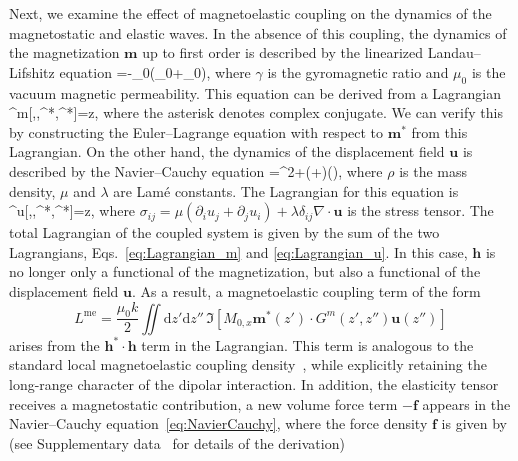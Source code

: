\documentclass[aps,prb,10pt,amsmath,amssymb,twocolumn,longbibliography,superscriptaddress]{revtex4-2}
\def\be#1\ee{\begin{align}#1\end{align}}
\newcommand{\rmd}{\mathrm{d}}
\begin{document}
Next, we examine the effect of magnetoelastic coupling on the dynamics of the magnetostatic and elastic waves. In the absence of this coupling, the dynamics of the magnetization $\bm{m}$ up to first order is described by the linearized Landau--Lifshitz equation
\be
    \dot{\bm{m}}=-\gamma\mu_0\left(\times{}_0+_0\times{}\right),\label{eq:LandauLifshitz}
\ee
where $\gamma$ is the gyromagnetic ratio and $\mu_0$ is the vacuum magnetic permeability. This equation can be derived from a Lagrangian
\be
    L^m[,,^*,^*]=\int\rmd z\Re{},\label{eq:Lagrangian_m}
\ee
where the asterisk denotes complex conjugate. We can verify this by constructing the Euler--Lagrange equation with respect to $\bm{m}^*$ from this Lagrangian. On the other hand, the dynamics of the displacement field $\bm{u}$ is described by the Navier--Cauchy equation
\be
    \rho{}=\mu\nabla^2+\left(\mu+\lambda\right)\nabla\left(\nabla\cdot{}\right),\label{eq:NavierCauchy}
\ee
where $\rho$ is the mass density, $\mu$ and $\lambda$ are Lam\'e constants. The Lagrangian for this equation is
\be
    L^u[,,^*,^*]=\int\rmd z\Re{},\label{eq:Lagrangian_u}
\ee
where $\sigma_{ij}=\mu(\partial_i u_j+\partial_j u_i)+\lambda\delta_{ij}\nabla\cdot\bm{u}$ is the stress tensor. The total Lagrangian of the coupled system is given by the sum of the two Lagrangians, Eqs.~\eqref{eq:Lagrangian_m} and \eqref{eq:Lagrangian_u}. In this case, $\bm{h}$ is no longer only a functional of the magnetization, but also a functional of the displacement field $\bm{u}$. As a result,  a magnetoelastic coupling term of the form
\begin{equation}
    L^{\mathrm{me}}
    =
    \frac{\mu_0 k}{2}
    \iint\mathrm{d}z'\mathrm{d}z''\,
    \Im\left[
    M_{0,x}\bm{m}^*(z')\cdot G^m(z',z'')\bm{u}(z'')
    \right]
\end{equation}
arises from the $\bm{h}^*\cdot\bm{h}$ term in the Lagrangian. This term is analogous to the standard local magnetoelastic coupling density~\cite{Kittel1949,KittelAbrahams1953,Neel1954, CallenCallen1963}, while explicitly retaining the long-range character of the dipolar interaction. In addition, the elasticity tensor receives a magnetostatic contribution, a new volume force term $-\bm{f}$ appears in the Navier--Cauchy equation~\eqref{eq:NavierCauchy}, where the force density $\bm{f}$ is given by (see Supplementary data~\cite{SM} for details of the derivation)
\end{document}
